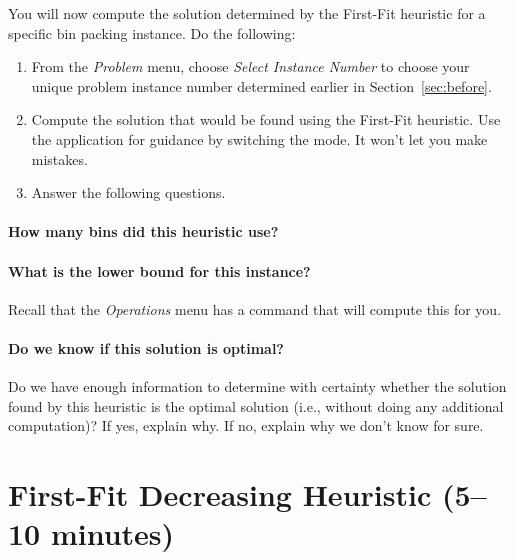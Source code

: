 \documentclass[11pt,letterpaper]{article}
\begin{document}
You will now compute the solution determined by the First-Fit
heuristic for a specific bin packing instance. Do the following:
\begin{enumerate}[leftmargin=*, parsep=0pt, itemsep=2pt, topsep=2pt, partopsep=0pt]
\item From the {\em Problem} menu, choose {\em Select Instance Number}
to choose your unique problem instance number determined earlier in 
Section~\ref{sec:before}.
\item Compute the solution that would be found using the First-Fit 
heuristic. Use the application for guidance by switching the mode.
It won't let you make mistakes.
\item Answer the following questions.
\end{enumerate}

\vspace*{-0.25in}

\paragraph*{How many bins did this heuristic use?}

\vspace*{0.25in}

\paragraph*{What is the lower bound for this instance?} Recall that the
{\em Operations} menu has a command that will compute this for you.

\vspace*{0.25in}

\paragraph*{Do we know if this solution is optimal?} Do we have enough 
information to determine with certainty whether the solution found by
this heuristic is the optimal solution (i.e., without doing any additional
computation)? If yes, explain why. If no, explain why we don't know for sure.

\vspace*{0.5in}



\section{First-Fit Decreasing Heuristic (5--10 minutes)}\label{sec:ffd}
\end{document}

